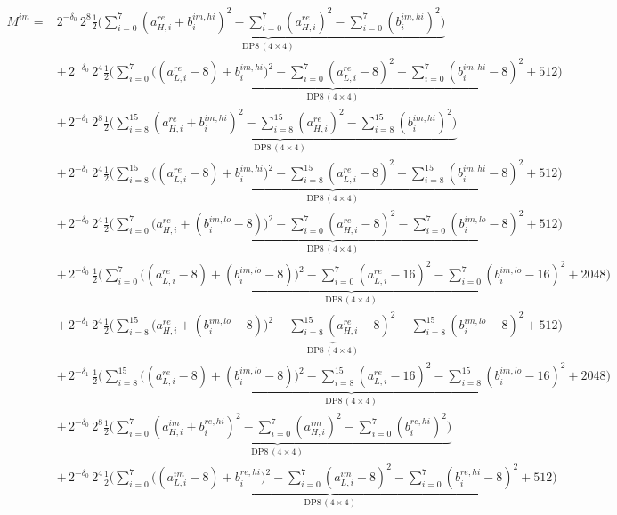 \documentclass[fleqn]{article}
\newcommand{\DPop}[3]{\mathrm{DP#1}\,(#2\!\times\!#3)}
\begin{document}
\begin{align*}
M^{im} = {}
  & 2^{-\delta_0}\,2^{8}\underbrace{\tfrac12\Big(\sum_{i=0}^{7}(a_{H,i}^{re}{+}b_i^{im,hi})^2 - \sum_{i=0}^{7}(a_{H,i}^{re})^2 - \sum_{i=0}^{7}(b_i^{im,hi})^2\Big)}_{\DPop{8}{4}{4}} \\[0.6em]
  & +\, 2^{-\delta_0}\,2^{4}\underbrace{\tfrac12\Big(\sum_{i=0}^{7}\big((a_{L,i}^{re}{-}8){+}b_i^{im,hi}\big)^2 - \sum_{i=0}^{7}(a_{L,i}^{re}{-}8)^2 - \sum_{i=0}^{7}(b_i^{im,hi}{-}8)^2 + 512\Big)}_{\DPop{8}{4}{4}} \\[0.6em]
  & +\, 2^{-\delta_1}\,2^{8}\underbrace{\tfrac12\Big(\sum_{i=8}^{15}(a_{H,i}^{re}{+}b_i^{im,hi})^2 - \sum_{i=8}^{15}(a_{H,i}^{re})^2 - \sum_{i=8}^{15}(b_i^{im,hi})^2\Big)}_{\DPop{8}{4}{4}} \\[0.6em]
  & +\, 2^{-\delta_1}\,2^{4}\underbrace{\tfrac12\Big(\sum_{i=8}^{15}\big((a_{L,i}^{re}{-}8){+}b_i^{im,hi}\big)^2 - \sum_{i=8}^{15}(a_{L,i}^{re}{-}8)^2 - \sum_{i=8}^{15}(b_i^{im,hi}{-}8)^2 + 512\Big)}_{\DPop{8}{4}{4}} \\[0.6em]
  & +\, 2^{-\delta_0}\,2^{4}\underbrace{\tfrac12\Big(\sum_{i=0}^{7}\big(a_{H,i}^{re}{+}(b_i^{im,lo}{-}8)\big)^2 - \sum_{i=0}^{7}(a_{H,i}^{re}{-}8)^2 - \sum_{i=0}^{7}(b_i^{im,lo}{-}8)^2 + 512\Big)}_{\DPop{8}{4}{4}} \\[0.6em]
  & +\, 2^{-\delta_0}\,\underbrace{\tfrac12\Big(\sum_{i=0}^{7}\big((a_{L,i}^{re}{-}8){+}(b_i^{im,lo}{-}8)\big)^2 - \sum_{i=0}^{7}(a_{L,i}^{re}{-}16)^2 - \sum_{i=0}^{7}(b_i^{im,lo}{-}16)^2 + 2048\Big)}_{\DPop{8}{4}{4}} \\[0.6em]
  & +\, 2^{-\delta_1}\,2^{4}\underbrace{\tfrac12\Big(\sum_{i=8}^{15}\big(a_{H,i}^{re}{+}(b_i^{im,lo}{-}8)\big)^2 - \sum_{i=8}^{15}(a_{H,i}^{re}{-}8)^2 - \sum_{i=8}^{15}(b_i^{im,lo}{-}8)^2 + 512\Big)}_{\DPop{8}{4}{4}} \\[0.6em]
  & +\, 2^{-\delta_1}\,\underbrace{\tfrac12\Big(\sum_{i=8}^{15}\big((a_{L,i}^{re}{-}8){+}(b_i^{im,lo}{-}8)\big)^2 - \sum_{i=8}^{15}(a_{L,i}^{re}{-}16)^2 - \sum_{i=8}^{15}(b_i^{im,lo}{-}16)^2 + 2048\Big)}_{\DPop{8}{4}{4}} \\[0.6em]
  & +\, 2^{-\delta_0}\,2^{8}\underbrace{\tfrac12\Big(\sum_{i=0}^{7}(a_{H,i}^{im}{+}b_i^{re,hi})^2 - \sum_{i=0}^{7}(a_{H,i}^{im})^2 - \sum_{i=0}^{7}(b_i^{re,hi})^2\Big)}_{\DPop{8}{4}{4}} \\[0.6em]
  & +\, 2^{-\delta_0}\,2^{4}\underbrace{\tfrac12\Big(\sum_{i=0}^{7}\big((a_{L,i}^{im}{-}8){+}b_i^{re,hi}\big)^2 - \sum_{i=0}^{7}(a_{L,i}^{im}{-}8)^2 - \sum_{i=0}^{7}(b_i^{re,hi}{-}8)^2 + 512\Big)}_{\DPop{8}{4}{4}} \\[0.6em]

\end{align*}
\end{document}

